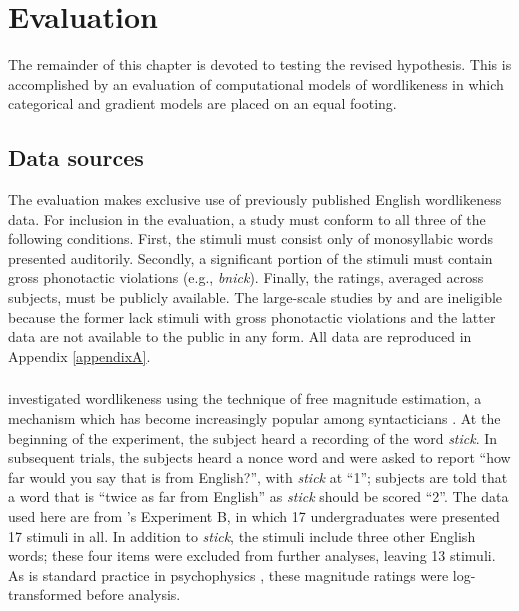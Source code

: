 \section{Evaluation} \label{2evaluation}

The remainder of this chapter is devoted to testing the revised hypothesis. This is accomplished by an evaluation of computational models of wordlikeness in which categorical and gradient models are placed on an equal footing.

\subsection{Data sources}

The evaluation makes exclusive use of previously published English wordlikeness data. For inclusion in the evaluation, a study must conform to all three of the following conditions. First, the stimuli must consist only of monosyllabic words presented auditorily. Secondly, a significant portion of the stimuli must contain gross phonotactic violations (e.g., \emph{bnick}). Finally, the ratings, averaged across subjects, must be publicly available. The large-scale studies by \citet{Bailey2001} and \citet{Shademan2006,Shademan2007} are ineligible because the former lack stimuli with gross phonotactic violations and the latter data are not available to the public in any form. All data are reproduced in Appendix \ref{appendixA}.

\subsubsection{\citealt{Greenberg1964}}

\citet{Greenberg1964} investigated wordlikeness using the technique of free magnitude estimation, a mechanism which has become increasingly popular among syntacticians \citep[e.g.,][]{Bard1996}. At the beginning of the experiment, the subject heard a recording of the word \emph{stick}. In subsequent trials, the subjects heard a nonce word and were asked to report ``how far would you say that is from English?'', with \emph{stick} at ``1''; subjects are told that a word that is ``twice as far from English'' as \emph{stick} should be scored ``2''. The data used here are from \citeauthor{Greenberg1964}'s Experiment B, in which 17 undergraduates were presented 17 stimuli in all. In addition to \emph{stick}, the stimuli include three other English words; these four items were excluded from further analyses, leaving 13 stimuli. As is standard practice in psychophysics \citep[e.g.,][]{Butler1987}, these magnitude ratings were log-transformed before analysis.

